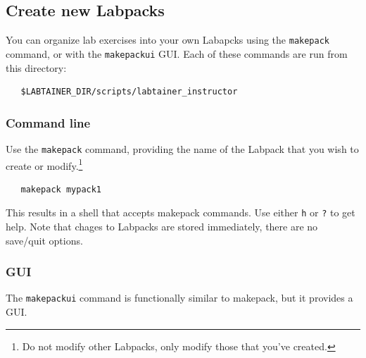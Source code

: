\documentclass[12pt]{article}
\begin{document}
\subsection{Create new Labpacks}
You can organize lab exercises into your own Labapcks using the {\tt makepack} command, or with the {\tt makepackui} GUI.  
Each of these commands are run from this directory:
\begin{verbatim}
   $LABTAINER_DIR/scripts/labtainer_instructor
\end{verbatim}
\subsubsection{Command line}
Use the {\tt makepack} command, providing the name of the Labpack that you wish
to create or modify.\footnote{Do not modify other Labpacks, only modify those that you've created.}  
\begin{verbatim}
   makepack mypack1
\end{verbatim}

\noindent This results in a shell that accepts makepack commands.  Use either {\tt h} or {\tt ?} to get help.  
Note that chages to Labpacks are stored immediately, there are no save/quit options.

\subsubsection{GUI}
The {\tt makepackui} command is functionally similar to makepack, but it provides a GUI.
\end{document}
